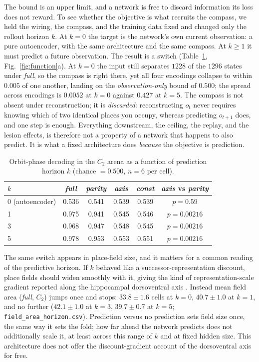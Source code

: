 \documentclass[9pt,lineno]{elife}
\begin{document}
The bound is an upper limit, and a network is free to discard information its loss does not reward. To
see whether the objective is what recruits the compass, we held the wiring, the compass, and the
training data fixed and changed only the rollout horizon $k$. At $k=0$ the target is the network's own
current observation: a pure autoencoder, with the same architecture and the same compass. At $k\ge1$ it
must predict a future observation. The result is a switch (Table~\ref{tab:horizon}, Fig.~\ref{fig:function}a). At
$k=0$ the input still separates $1228$ of the $1296$ states under \textit{full}, so the compass is right
there, yet all four encodings collapse to within $0.005$ of one another, landing on the
\emph{observation-only} bound of $0.500$; the spread across encodings is $0.0052$ at $k=0$ against
$0.427$ at $k=5$. The compass is not absent under reconstruction; it is \emph{discarded}: reconstructing
$o_t$ never requires knowing which of two identical places you occupy, whereas predicting $o_{t+1}$ does,
and one step is enough. Everything downstream, the ceiling, the replay, and the lesion effects, is
therefore not a property of a network that happens to also predict. It is what a fixed architecture
does \emph{because} the objective is prediction.

\begin{table}[t]
\centering
\caption{Orbit-phase decoding in the $C_2$ arena as a function of prediction horizon $k$
(chance $= 0.500$, $n = 6$ per cell).}
\label{tab:horizon}
\begin{tabular}{lccccc}
\toprule
$k$ & \textit{full} & \textit{parity} & \textit{axis} & \textit{const} & \textit{axis} vs \textit{parity} \\
\midrule
0 (autoencoder) & 0.536 & 0.541 & 0.539 & 0.539 & $p = 0.59$ \\
1 & 0.975 & 0.941 & 0.545 & 0.546 & $p = 0.00216$ \\
3 & 0.968 & 0.947 & 0.548 & 0.545 & $p = 0.00216$ \\
5 & 0.978 & 0.953 & 0.553 & 0.551 & $p = 0.00216$ \\
\bottomrule
\end{tabular}
\end{table}

The same switch appears in place-field size, and it matters for a common reading of the predictive
horizon. If $k$ behaved like a successor-representation discount, place fields should widen smoothly
with it, giving the kind of representation-scale gradient reported along the hippocampal dorsoventral
axis \citep{kjelstrup2008}. Instead mean field area (\textit{full}, $C_2$) jumps once and stops:
$33.8 \pm 1.6$ cells at $k=0$, $40.7 \pm 1.0$ at $k=1$, and no further ($42.1 \pm 1.0$ at $k=3$,
$39.7 \pm 0.7$ at $k=5$; \texttt{field\_area\_horizon.csv}). Prediction versus no prediction sets field
size once, the same way it sets the fold; how far ahead the network predicts does not additionally
scale it, at least across this range of $k$ and at fixed hidden size. This architecture does not offer
the discount-gradient account of the dorsoventral axis for free.
\end{document}

